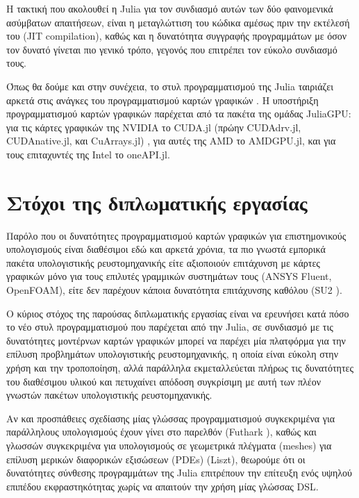 Η τακτική που ακολουθεί η Julia για τον συνδιασμό αυτών των δύο φαινομενικά ασύμβατων απαιτήσεων, είναι η μεταγλώττιση του κώδικα αμέσως πριν την εκτέλεσή του (JIT compilation), καθώς και η δυνατότητα συγγραφής προγραμμάτων με όσον τον δυνατό γίνεται πιο γενικό τρόπο, γεγονός που επιτρέπει τον εύκολο συνδιασμό τους.

Όπως θα δούμε και στην συνέχεια, το στυλ προγραμματισμού της Julia ταιριάζει αρκετά στις ανάγκες του προγραμματισμού καρτών γραφικών \cite{Besard2019b}.
Η υποστήριξη προγραμματισμού καρτών γραφικών παρέχεται από τα πακέτα της ομάδας JuliaGPU: για τις κάρτες γραφικών της NVIDIA το CUDA.jl (πρώην CUDAdrv.jl, CUDAnative.jl, και CuArrays.jl) \cite{Besard2019a}, για αυτές της AMD το AMDGPU.jl, και για τους επιταχυντές της Intel το oneAPI.jl.

\section{Στόχοι της διπλωματικής εργασίας}

Παρόλο που οι δυνατότητες προγραμματισμού καρτών γραφικών για επιστημονικούς υπολογισμούς είναι διαθέσιμοι εδώ και αρκετά χρόνια, τα πιο γνωστά εμπορικά πακέτα υπολογιστικής ρευστομηχανικής είτε αξιοποιούν επιτάχυνση με κάρτες γραφικών μόνο για τους επιλυτές γραμμικών συστημάτων τους (ANSYS Fluent, OpenFOAM), είτε δεν παρέχουν κάποια δυνατότητα επιτάχυνσης καθόλου (SU2 \cite{Palacios2013}).


Ο κύριος στόχος της παρούσας διπλωματικής εργασίας είναι να ερευνήσει κατά πόσο το νέο στυλ προγραμματισμού που παρέχεται από την Julia, σε συνδιασμό με τις δυνατότητες μοντέρνων καρτών γραφικών μπορεί να παρέχει μία πλατφόρμα για την επίλυση προβλημάτων υπολογιστικής ρευστομηχανικής, η οποία είναι εύκολη στην χρήση και την τροποποίηση, αλλά παράλληλα εκμεταλλεύεται πλήρως τις δυνατότητες του διαθέσιμου υλικού και πετυχαίνει απόδοση συγκρίσιμη με αυτή των πλέον γνωστών πακέτων υπολογιστικής ρευστομηχανικής.

Αν και προσπάθειες σχεδίασης μίας γλώσσας προγραμματισμού συγκεκριμένα για παράλληλους υπολογισμούς έχουν γίνει στο παρελθόν (Futhark \cite{Henriksen2017}), καθώς και γλωσσών συγκεκριμένα για υπολογισμούς σε γεωμετρικά πλέγματα (meshes) για επίλυση μερικών διαφορικών εξισώσεων (PDEs) (Liszt), θεωρούμε ότι οι δυνατότητες σύνθεσης προγραμμάτων της Julia επιτρέπουν την επίτευξη ενός υψηλού επιπέδου εκφραστηκότητας χωρίς να απαιτούν την χρήση μίας γλώσσας DSL.

